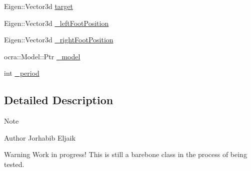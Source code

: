 \begin{DoxyCompactItemize}
\item 
\-Eigen\-::\-Vector3d \hyperlink{classStepController_a588d5b149eb4a6877e89ecff37d0f91d}{target}
\item 
\-Eigen\-::\-Vector3d \hyperlink{classStepController_a6bc27bbd20adf3bc0a1b010a14dece95}{\-\_\-left\-Foot\-Position}
\item 
\-Eigen\-::\-Vector3d \hyperlink{classStepController_a064d9f5406f9221e4351617a177c1cef}{\-\_\-right\-Foot\-Position}
\item 
ocra\-::\-Model\-::\-Ptr \hyperlink{classStepController_aa07914c0186c24fd4fc02612d0ee6332}{\-\_\-model}
\item 
int \hyperlink{classStepController_a8b98494b6b9d13b41c6838d127078085}{\-\_\-period}
\end{DoxyCompactItemize}


\subsection{\-Detailed \-Description}
\begin{DoxyNote}{\-Note}

\end{DoxyNote}
\begin{DoxyAuthor}{\-Author}
\-Jorhabib \-Eljaik
\end{DoxyAuthor}
\begin{DoxyWarning}{\-Warning}
\-Work in progress! \-This is still a barebone class in the process of being tested. 
\end{DoxyWarning}


